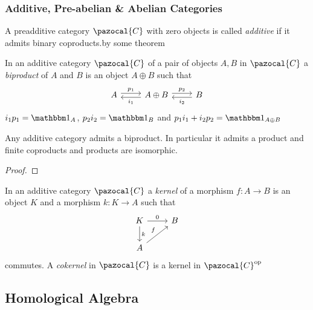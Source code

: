 \subsubsection{Additive, Pre-abelian \& Abelian Categories}
\begin{definition}
    A preadditive category $\pazocal{C}$ with zero objects is called \textit{additive} if it admits binary coproducts.{\LARGE by some theorem} 
\end{definition}
\begin{definition}
    In an additive category $\pazocal{C}$ of a pair of objects $A,B$ in $\pazocal{C}$ a \textit{biproduct} of $A$ and $B$ is an object $A\oplus B$ such that 
    $$\begin{tikzcd}
        A \arrow[r, shift left, "p_1"] & A\oplus B \arrow[l, shift left, "i_1"] \arrow[r,shift left, "p_2"] & B \arrow[l, shift left, "i_2"]
    \end{tikzcd}$$
    $i_1p_1 = \fone_A$, $p_2i_2 = \fone_B$ and $p_1i_1+ i_2p_2=\fone_{A\oplus B}$
\end{definition}
\begin{lemma}
    Any additive category admits a biproduct. In particular it admits a product and finite coproducts and products are isomorphic. 
\end{lemma}
\begin{proof}
    
\end{proof}
\begin{definition}
    In an additive category $\pazocal{C}$ a \textit{kernel} of a morphism $f: A \rightarrow B$ is an object $K$ and a morphism $k: K \rightarrow A $ such that 
    $$\begin{tikzcd}
        K \arrow[r, "0"] \arrow[d, "k"] & B\\
        A \arrow[ur, "f"]
    \end{tikzcd}$$
    commutes. 
    A \textit{cokernel} in $\pazocal{C}$ is a kernel in $\pazocal{C}\op$
\end{definition}
    
\subsection{Homological Algebra}
